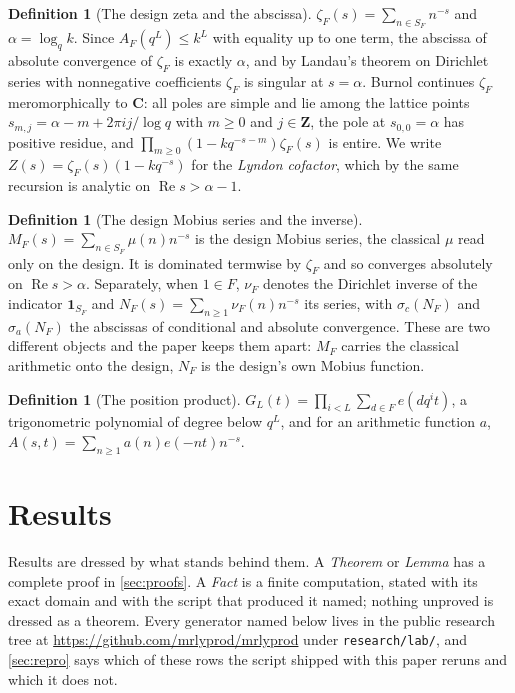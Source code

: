 \documentclass[11pt]{amsart}
\theoremstyle{definition}
\newtheorem{definition}[theorem]{Definition}
\theoremstyle{remark}
\begin{document}
\begin{definition}[The design zeta and the abscissa]
\label{def:zeta}
$\zeta_{F}(s) = \sum_{n \in S_{F}} n^{-s}$ and $\alpha = \log_{q} k$. Since $A_{F}(q^{L}) \le k^{L}$ with equality up to one term, the abscissa of absolute convergence of $\zeta_{F}$ is exactly $\alpha$, and by Landau's theorem on Dirichlet series with nonnegative coefficients $\zeta_{F}$ is singular at $s = \alpha$. Burnol \cite{bur} continues $\zeta_{F}$ meromorphically to $\mathbf{C}$: all poles are simple and lie among the lattice points $s_{m,j} = \alpha - m + 2\pi i j/\log q$ with $m \ge 0$ and $j \in \mathbf{Z}$, the pole at $s_{0,0} = \alpha$ has positive residue, and $\prod_{m \ge 0}(1 - k q^{-s-m}) \zeta_{F}(s)$ is entire. We write $Z(s) = \zeta_{F}(s)(1 - k q^{-s})$ for the \emph{Lyndon cofactor}, which by the same recursion is analytic on $\operatorname{Re} s > \alpha - 1$.
\end{definition}

\begin{definition}[The design Mobius series and the inverse]
\label{def:inverse}
$M_{F}(s) = \sum_{n \in S_{F}} \mu(n) n^{-s}$ is the design Mobius series, the classical $\mu$ read only on the design. It is dominated termwise by $\zeta_{F}$ and so converges absolutely on $\operatorname{Re} s > \alpha$. Separately, when $1 \in F$, $\nu_{F}$ denotes the Dirichlet inverse of the indicator $\mathbf{1}_{S_{F}}$ and $N_{F}(s) = \sum_{n \ge 1} \nu_{F}(n) n^{-s}$ its series, with $\sigma_{c}(N_{F})$ and $\sigma_{a}(N_{F})$ the abscissas of conditional and absolute convergence. These are two different objects and the paper keeps them apart: $M_{F}$ carries the classical arithmetic onto the design, $N_{F}$ is the design's own Mobius function.
\end{definition}

\begin{definition}[The position product]
\label{def:position}
$G_{L}(t) = \prod_{i < L} \sum_{d \in F} e(d q^{i} t)$, a trigonometric polynomial of degree below $q^{L}$, and for an arithmetic function $a$, $A(s,t) = \sum_{n \ge 1} a(n) e(-nt) n^{-s}$.
\end{definition}

\section{Results}
\label{sec:results}

Results are dressed by what stands behind them. A \emph{Theorem} or \emph{Lemma} has a complete proof in \cref{sec:proofs}. A \emph{Fact} is a finite computation, stated with its exact domain and with the script that produced it named; nothing unproved is dressed as a theorem. Every generator named below lives in the public research tree at \url{https://github.com/mrlyprod/mrlyprod} under \texttt{research/lab/}, and \cref{sec:repro} says which of these rows the script shipped with this paper reruns and which it does not.
\end{document}

